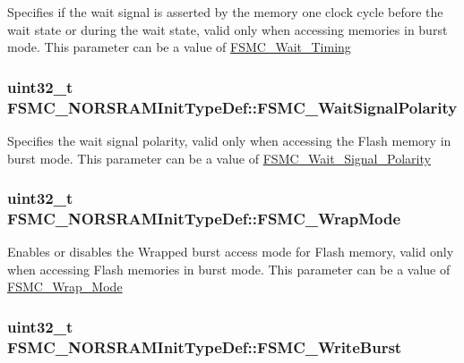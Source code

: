 Specifies if the wait signal is asserted by the memory one clock cycle before the wait state or during the wait state, valid only when accessing memories in burst mode. This parameter can be a value of \hyperlink{group__FSMC__Wait__Timing}{FSMC\_\-Wait\_\-Timing} \hypertarget{structFSMC__NORSRAMInitTypeDef_a5d4d76594fc201943b51095e3ef34791}{
\subsubsection[{FSMC\_\-WaitSignalPolarity}]{\setlength{\rightskip}{0pt plus 5cm}uint32\_\-t {\bf FSMC\_\-NORSRAMInitTypeDef::FSMC\_\-WaitSignalPolarity}}}
\label{structFSMC__NORSRAMInitTypeDef_a5d4d76594fc201943b51095e3ef34791}
Specifies the wait signal polarity, valid only when accessing the Flash memory in burst mode. This parameter can be a value of \hyperlink{group__FSMC__Wait__Signal__Polarity}{FSMC\_\-Wait\_\-Signal\_\-Polarity} \hypertarget{structFSMC__NORSRAMInitTypeDef_a7e201c17bf7c5f6cc69fb6de29c8b024}{
\subsubsection[{FSMC\_\-WrapMode}]{\setlength{\rightskip}{0pt plus 5cm}uint32\_\-t {\bf FSMC\_\-NORSRAMInitTypeDef::FSMC\_\-WrapMode}}}
\label{structFSMC__NORSRAMInitTypeDef_a7e201c17bf7c5f6cc69fb6de29c8b024}
Enables or disables the Wrapped burst access mode for Flash memory, valid only when accessing Flash memories in burst mode. This parameter can be a value of \hyperlink{group__FSMC__Wrap__Mode}{FSMC\_\-Wrap\_\-Mode} \hypertarget{structFSMC__NORSRAMInitTypeDef_adac3756711f2d76e56a8cbcb7a03843d}{
\subsubsection[{FSMC\_\-WriteBurst}]{\setlength{\rightskip}{0pt plus 5cm}uint32\_\-t {\bf FSMC\_\-NORSRAMInitTypeDef::FSMC\_\-WriteBurst}}}
